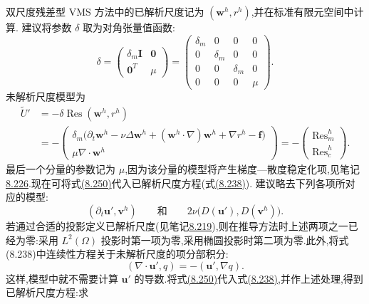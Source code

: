 \begin{note}
\label{note:vms-application-navier-stokes}
双尺度残差型 VMS 方法中的已解析尺度记为 $(\bm{w}^h,r^h)$,并在标准有限元空间中计算.\textcite{Bazilevs2007} 建议将参数 $\delta$ 取为对角张量值函数:
\begin{equation}\label{eq:vms-residual-parameter-tensor}
 \delta=\begin{pmatrix}\delta_m\bm I&\bm 0\\
                           \bm 0^{T}&\mu\end{pmatrix}
 =\begin{pmatrix}
 \delta_m&0&0&0\\
 0&\delta_m&0&0\\
 0&0&\delta_m&0\\
 0&0&0&\mu
 \end{pmatrix}.
\end{equation}
未解析尺度模型为
\begin{equation}\label{eq:vms-algebraic-unresolved-model}
\begin{aligned}
 \widetilde U'
 &=-\delta\operatorname{Res}(\bm{w}^h,r^h)\\
 &=-\begin{pmatrix}
 \delta_m\bigl(\partial_t\bm{w}^h-\nu\Delta\bm{w}^h
 +(\bm{w}^h\cdot\nabla)\bm{w}^h+\nabla r^h-\bm f\bigr)\\
 \mu\nabla\cdot\bm{w}^h
 \end{pmatrix}
 =-\begin{pmatrix}\operatorname{Res}_m^h\\
                    \operatorname{Res}_c^h\end{pmatrix}.
\end{aligned}
\end{equation}
最后一个分量的参数记为 $\mu$,因为该分量的模型将产生梯度—散度稳定化项,见笔记\hyperref[note:vms-grad-div-stabilization]{8.226}.现在可将式\hyperref[eq:vms-algebraic-unresolved-model]{(8.250)}代入已解析尺度方程(式\hyperref[eq:vms-two-scale-decomposition-1]{(8.238)}).\textcite{Bazilevs2007} 建议略去下列各项所对应的模型:
\[
 (\partial_t\bm{u}',\bm{v}^h)
 \qquad\text{和}\qquad
 2\nu\bigl(D(\bm{u}'),D(\bm{v}^h)\bigr).
\]
若通过合适的投影定义已解析尺度(见笔记\hyperref[note:vms-projection-scale-separation]{8.219}),则在推导方法时上述两项之一已经为零:采用 $L^2(\Omega)$ 投影时第一项为零,采用椭圆投影时第二项为零.此外,将式(8.238)中连续性方程关于未解析尺度的项分部积分:
\[
 (\nabla\cdot\bm{u}',q)=-(\bm{u}',\nabla q).
\]
这样,模型中就不需要计算 $\bm{u}'$ 的导数.将式\hyperref[eq:vms-algebraic-unresolved-model]{(8.250)}代入式\hyperref[eq:vms-two-scale-decomposition-1]{(8.238)},并作上述处理,得到已解析尺度方程:求

\end{note}
